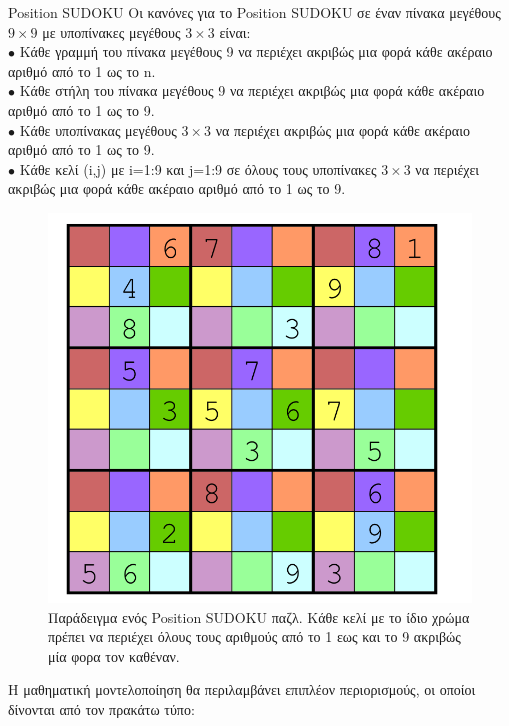\documentclass[12pt]{book}
\theoremstyle{definition}
\begin{document}
\begin{mytheorem}{Position SUDOKU}{}
	Οι κανόνες για το Position SUDOKU σε έναν πίνακα μεγέθους \(9 \times 9\) με υποπίνακες μεγέθους \(3 \times 3\) είναι: \\
	\(\bullet\) Κάθε γραμμή του πίνακα μεγέθους 9 να περιέχει ακριβώς μια φορά κάθε ακέραιο αριθμό από το 1 ως το n. \\
	\(\bullet\) Κάθε στήλη του πίνακα μεγέθους 9 να περιέχει ακριβώς μια φορά κάθε ακέραιο αριθμό από το 1 ως το 9. \\
	\(\bullet\) Κάθε υποπίνακας μεγέθους \(3 \times 3\) να περιέχει ακριβώς μια φορά κάθε ακέραιο αριθμό από το 1 ως το 9. \\
	\(\bullet\) Κάθε κελί (i,j) με i=1:9 και j=1:9 σε όλους τους υποπίνακες \(3 \times 3\) να περιέχει ακριβώς μια φορά κάθε ακέραιο αριθμό από το 1 ως το 9.
\end{mytheorem}

\begin{figure}[h]
	\centering
	\includegraphics[scale=0.4]{Figures/positionSUDOKU.png}
	\caption{Παράδειγμα ενός Position SUDOKU παζλ. Κάθε κελί με το ίδιο χρώμα πρέπει να περιέχει όλους τους αριθμούς από το 1 εως και το 9 ακριβώς μία φορα τον καθέναν.}
\end{figure}

Η μαθηματική μοντελοποίηση θα περιλαμβάνει επιπλέον περιορισμούς, οι οποίοι δίνονται από τον πρακάτω τύπο:
\end{document}
